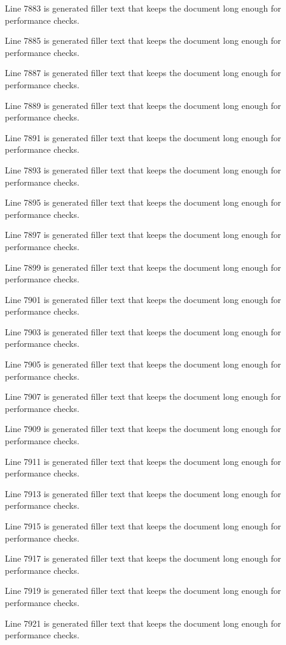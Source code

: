 Line 7883 is generated filler text that keeps the document long enough for performance checks.

Line 7885 is generated filler text that keeps the document long enough for performance checks.

Line 7887 is generated filler text that keeps the document long enough for performance checks.

Line 7889 is generated filler text that keeps the document long enough for performance checks.

Line 7891 is generated filler text that keeps the document long enough for performance checks.

Line 7893 is generated filler text that keeps the document long enough for performance checks.

Line 7895 is generated filler text that keeps the document long enough for performance checks.

Line 7897 is generated filler text that keeps the document long enough for performance checks.

Line 7899 is generated filler text that keeps the document long enough for performance checks.

Line 7901 is generated filler text that keeps the document long enough for performance checks.

Line 7903 is generated filler text that keeps the document long enough for performance checks.

Line 7905 is generated filler text that keeps the document long enough for performance checks.

Line 7907 is generated filler text that keeps the document long enough for performance checks.

Line 7909 is generated filler text that keeps the document long enough for performance checks.

Line 7911 is generated filler text that keeps the document long enough for performance checks.

Line 7913 is generated filler text that keeps the document long enough for performance checks.

Line 7915 is generated filler text that keeps the document long enough for performance checks.

Line 7917 is generated filler text that keeps the document long enough for performance checks.

Line 7919 is generated filler text that keeps the document long enough for performance checks.

Line 7921 is generated filler text that keeps the document long enough for performance checks.

